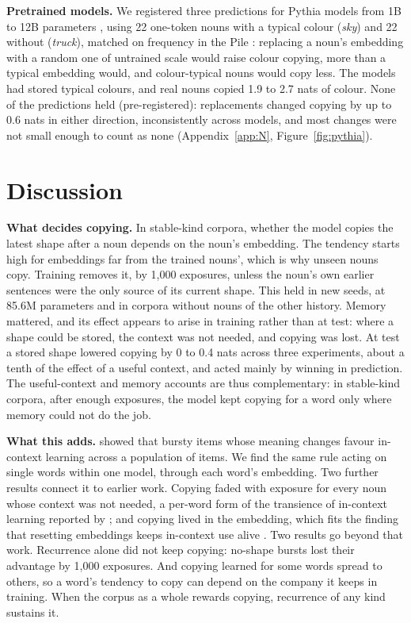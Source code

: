\documentclass[11pt]{article}
\begin{document}
\textbf{Pretrained models.} We registered three predictions for Pythia models from 1B to 12B parameters \citep{biderman2023}, using 22 one-token nouns with a typical colour (\emph{sky}) and 22 without (\emph{truck}), matched on frequency in the Pile \citep{gao2020,liu2024infinigram}: replacing a noun's embedding with a random one of untrained scale would raise colour copying, more than a typical embedding would, and colour-typical nouns would copy less. The models had stored typical colours, and real nouns copied 1.9 to 2.7 nats of colour. None of the predictions held (pre-registered): replacements changed copying by up to 0.6 nats in either direction, inconsistently across models, and most changes were not small enough to count as none (Appendix~\ref{app:N}, Figure~\ref{fig:pythia}).

\section{Discussion}\label{sec:discussion}
\textbf{What decides copying.} In stable-kind corpora, whether the model copies the latest shape after a noun depends on the noun's embedding. The tendency starts high for embeddings far from the trained nouns', which is why unseen nouns copy. Training removes it, by 1,000 exposures, unless the noun's own earlier sentences were the only source of its current shape. This held in new seeds, at 85.6M parameters and in corpora without nouns of the other history. Memory mattered, and its effect appears to arise in training rather than at test: where a shape could be stored, the context was not needed, and copying was lost. At test a stored shape lowered copying by 0 to 0.4 nats across three experiments, about a tenth of the effect of a useful context, and acted mainly by winning in prediction. The useful-context and memory accounts are thus complementary: in stable-kind corpora, after enough exposures, the model kept copying for a word only where memory could not do the job.

\textbf{What this adds.} \citet{chan2022} showed that bursty items whose meaning changes favour in-context learning across a population of items. We find the same rule acting on single words within one model, through each word's embedding. Two further results connect it to earlier work. Copying faded with exposure for every noun whose context was not needed, a per-word form of the transience of in-context learning reported by \citet{singh2023}; and copying lived in the embedding, which fits the finding that resetting embeddings keeps in-context use alive \citep{anand2025}. Two results go beyond that work. Recurrence alone did not keep copying: no-shape bursts lost their advantage by 1,000 exposures. And copying learned for some words spread to others, so a word's tendency to copy can depend on the company it keeps in training. When the corpus as a whole rewards copying, recurrence of any kind sustains it.
\end{document}
